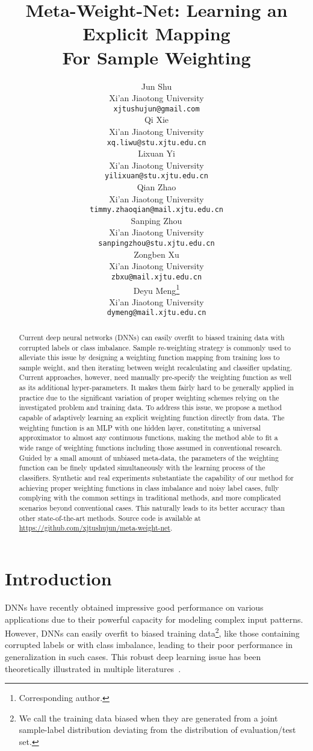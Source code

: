 \documentclass{article}
\title{Meta-Weight-Net: Learning an Explicit Mapping \\For Sample Weighting}
\author{Jun Shu\\
	Xi'an Jiaotong University\\
	\texttt{xjtushujun@gmail.com} \\
\And
	Qi Xie \\
	Xi'an Jiaotong University\\
	\texttt{xq.liwu@stu.xjtu.edu.cn} \\
	\And
	Lixuan Yi \\
	Xi'an Jiaotong University\\
	\texttt{yilixuan@stu.xjtu.edu.cn} \\
	\And
	Qian Zhao \\
	Xi'an Jiaotong University\\
	\texttt{timmy.zhaoqian@mail.xjtu.edu.cn} \\
	\And
	Sanping Zhou \\
	Xi'an Jiaotong University\\
	\texttt{sanpingzhou@stu.xjtu.edu.cn} \\
	\And
	Zongben Xu \\
	Xi'an Jiaotong University\\
	\texttt{zbxu@mail.xjtu.edu.cn} \\
	\And
	Deyu Meng\thanks{Corresponding author.}\\
	Xi'an Jiaotong University\\
	\texttt{dymeng@mail.xjtu.edu.cn} \\
}
\begin{document}
	\maketitle
	\vspace{0mm}
	\begin{abstract}
		Current deep neural networks (DNNs) can easily overfit to biased training data with corrupted labels or class imbalance. Sample re-weighting strategy is commonly used to alleviate this issue by designing a weighting function mapping from training loss to sample weight, and then iterating between weight recalculating and classifier updating. Current approaches, however, need manually pre-specify the weighting function as well as its additional hyper-parameters. It makes them fairly hard to be generally applied in practice due to the significant variation of proper weighting schemes relying on the investigated problem and training data. To address this issue, we propose a method capable of adaptively learning an explicit weighting function directly from data. The weighting function is an MLP with one hidden layer, constituting a universal approximator to almost any continuous functions, making the method able to fit a wide range of weighting functions including those assumed in conventional research. Guided by a small amount of unbiased meta-data, the parameters of the weighting function can be finely updated simultaneously with the learning process of the classifiers. Synthetic and real experiments substantiate the capability of our method for achieving proper weighting functions in class imbalance and noisy label cases, fully complying with the common settings in traditional methods, and more complicated scenarios beyond conventional cases. This naturally leads to its better accuracy than other state-of-the-art methods. Source code is available at \url{https://github.com/xjtushujun/meta-weight-net}.
	\end{abstract}\vspace{0mm}
	\setcounter{footnote}{0}
	\section{Introduction}
	\label{introduction}
	DNNs have recently obtained impressive good performance on various applications due to their powerful capacity for modeling complex input patterns. However, DNNs can easily overfit to biased training data\footnote{We call the training data biased when they are generated from a joint sample-label distribution deviating from the distribution of evaluation/test set\cite{ren2018learning}.}, like those containing corrupted labels \cite{zhang2016understanding} or with class imbalance\cite{he2008learning}, leading to their poor performance in generalization in such cases. This robust deep learning issue has been theoretically illustrated in multiple literatures~\cite{neyshabur2017exploring,arpit2017closer,kawaguchi2017generalization,novak2018sensitivity,galar2012review,buda2018systematic}.
	
\end{document}
